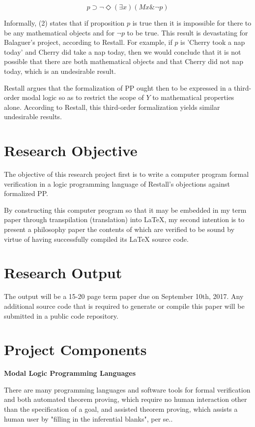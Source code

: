 \documentclass[12pt]{article}
\theoremstyle{definition}
\begin{document}
\begin{equation}
    p \supset \neg \Diamond (\exists x) (Mx \& \neg p)
\end{equation}

Informally, (2) states that if proposition $p$ is true then it is impossible
for there to be any mathematical objects and for $\neg p$ to be true. This
result is devastating for Balaguer's project, according to Restall. For
example, if $p$ is 'Cherry took a nap today' and Cherry did take a nap today,
then we would conclude that it is not possible that there are both mathematical
objects and that Cherry did not nap today, which is an undesirable
result\cite{restall}.

Restall argues that the formalization of PP ought then to be expressed in a
third-order modal logic so as to restrict the scope of $Y$ to mathematical
properties alone. According to Restall, this third-order formalization yields
similar undesirable results.

\section{Research Objective}

The objective of this research project first is to write a computer program
formal verification in a logic programming language of Restall's objections
against formalized PP.

By constructing this computer program so that it may be embedded in my term
paper through transpilation (translation) into LaTeX, my second intention is to
present a philosophy paper the contents of which are verified to be sound by
virtue of having successfully compiled its LaTeX source code.

\section{Research Output}

The output will be a 15-20 page term paper due on September 10th, 2017. Any
additional source code that is required to generate or compile this paper will
be submitted in a public code repository.

\section{Project Components}

\textbf{Modal Logic Programming Languages}

There are many programming languages and software tools for formal verification
and both automated theorem proving, which require no human interaction other
than the specification of a goal, and assisted theorem proving, which assists a
human user by "filling in the inferential blanks", per se.. 
\end{document}
